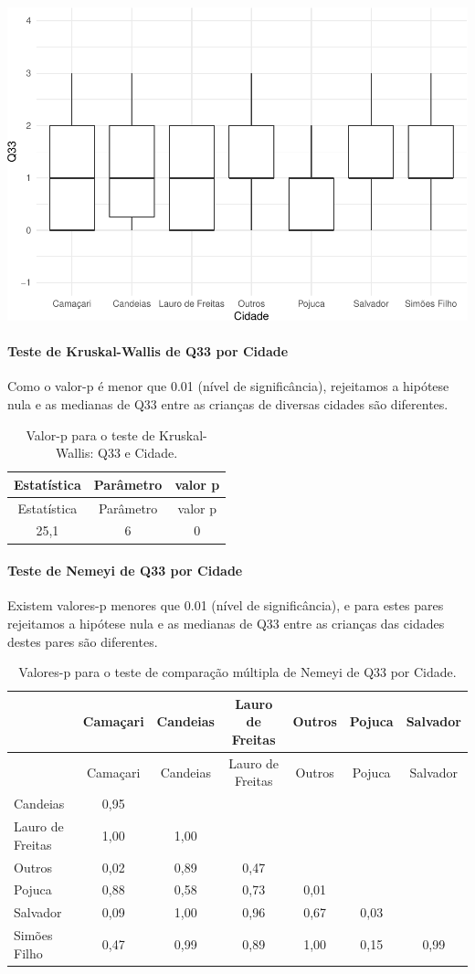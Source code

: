 \documentclass[]{article}
\let\oldparagraph\paragraph
\renewcommand{\paragraph}[1]{\oldparagraph{#1}\mbox{}}
\begin{document}
\begin{center}\includegraphics[width=0.75\linewidth]{relatorio_covid19_files/figure-latex/unnamed-chunk-1138-1} \end{center}

\hypertarget{teste-de-kruskal-wallis-de-q33-por-cidade}{%
\paragraph{Teste de Kruskal-Wallis de Q33 por Cidade}\label{teste-de-kruskal-wallis-de-q33-por-cidade}}

Como o valor-p é menor que 0.01 (nível de significância), rejeitamos a hipótese nula e as medianas de Q33 entre as crianças de diversas cidades são diferentes.

\begin{longtable}[]{@{}ccc@{}}
\caption{\label{tab:unnamed-chunk-1140}Valor-p para o teste de Kruskal-Wallis: Q33 e Cidade.}\tabularnewline
\toprule
Estatística & Parâmetro & valor p\tabularnewline
\midrule
\endfirsthead
\toprule
Estatística & Parâmetro & valor p\tabularnewline
\midrule
\endhead
25,1 & 6 & 0\tabularnewline
\bottomrule
\end{longtable}

\hypertarget{teste-de-nemeyi-de-q33-por-cidade}{%
\paragraph{Teste de Nemeyi de Q33 por Cidade}\label{teste-de-nemeyi-de-q33-por-cidade}}

Existem valores-p menores que 0.01 (nível de significância), e para estes pares rejeitamos a hipótese nula e as medianas de Q33 entre as crianças das cidades destes pares são diferentes.

\begin{longtable}[]{@{}lcccccc@{}}
\caption{\label{tab:unnamed-chunk-1142}Valores-p para o teste de comparação múltipla de Nemeyi de Q33 por Cidade.}\tabularnewline
\toprule
& Camaçari & Candeias & Lauro de Freitas & Outros & Pojuca & Salvador\tabularnewline
\midrule
\endfirsthead
\toprule
& Camaçari & Candeias & Lauro de Freitas & Outros & Pojuca & Salvador\tabularnewline
\midrule
\endhead
Candeias & 0,95 & & & & &\tabularnewline
Lauro de Freitas & 1,00 & 1,00 & & & &\tabularnewline
Outros & 0,02 & 0,89 & 0,47 & & &\tabularnewline
Pojuca & 0,88 & 0,58 & 0,73 & 0,01 & &\tabularnewline
Salvador & 0,09 & 1,00 & 0,96 & 0,67 & 0,03 &\tabularnewline
Simões Filho & 0,47 & 0,99 & 0,89 & 1,00 & 0,15 & 0,99\tabularnewline
\bottomrule
\end{longtable}
\end{document}
